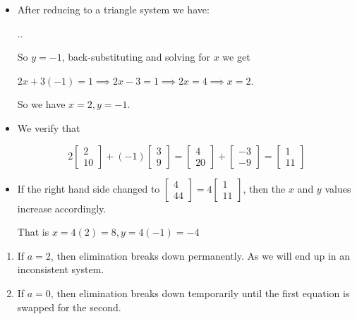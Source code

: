        \item [2]

          \begin{itemize}
            \item
              After reducing to a triangle system we have:

              \sysdelim..

              So $y = -1$, back-substituting and solving for $x$ we get

              $2x + 3(-1) = 1 \implies 2x - 3 = 1 \implies 2x = 4 \implies x = 2$.

              So we have $x = 2, y = -1$.
            \item
              We verify that

              \[
                2 \begin{bmatrix}2 \\ 10\end{bmatrix} + (-1) \begin{bmatrix}3 \\ 9\end{bmatrix}
                = \begin{bmatrix}4 \\ 20\end{bmatrix} + \begin{bmatrix}-3 \\ -9\end{bmatrix}
                = \begin{bmatrix}1 \\ 11\end{bmatrix}
              \]
            \item
              If the right hand side changed to $\begin{bmatrix}4 \\ 44\end{bmatrix} = 4\begin{bmatrix}1 \\ 11\end{bmatrix}$,
              then the $x$ and $y$ values increase accordingly.

              That is $x = 4(2) = 8, y = 4(-1) = -4$
          \end{itemize}

        \item [7]
          \begin{enumerate}
            \item
              If $a = 2$, then elimination breaks down permanently.
              As we will end up in an inconsistent system.
            \item
              If $a = 0$, then elimination breaks down temporarily
              until the first equation is swapped for the second.
          \end{enumerate}

